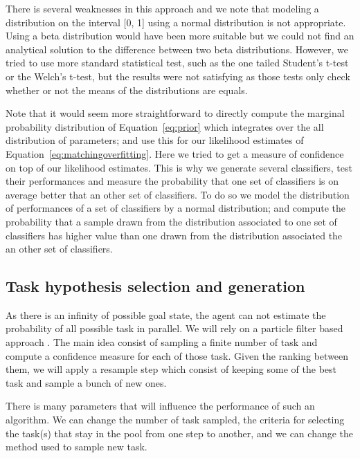 There is several weaknesses in this approach and we note that modeling a distribution on the interval [0, 1] using a normal distribution is not appropriate. Using a beta distribution would have been more suitable but we could not find an analytical solution to the difference between two beta distributions. However, we tried to use more standard statistical test, such as the one tailed Student's t-test or the Welch's t-test, but the results were not satisfying as those tests only check whether or not the means of the distributions are equals.

Note that it would seem more straightforward to directly compute the marginal probability distribution of Equation~\ref{eq:prior} which integrates over the all distribution of parameters; and use this for our likelihood estimates of Equation~\ref{eq:matchingoverfitting}. Here we tried to get a measure of confidence on top of our likelihood estimates. This is why we generate several classifiers, test their performances and measure the probability that one set of classifiers is on average better that an other set of classifiers. To do so we model the distribution of performances of a set of classifiers by a normal distribution; and compute the probability that a sample drawn from the distribution associated to one set of classifiers has higher value than one drawn from the distribution associated the an other set of classifiers.

\subsection{Task hypothesis selection and generation}
\label{chapter:limitations:continoushypothesis:particlefilter}

As there is an infinity of possible goal state, the agent can not estimate the probability of all possible task in parallel. We will rely on a particle filter based approach \cite{gordon1993novel,doucet2009tutorial,thrun2002particle}. The main idea consist of sampling a finite number of task and compute a confidence measure for each of those task. Given the ranking between them, we will apply a resample step which consist of keeping some of the best task and sample a bunch of new ones.

There is many parameters that will influence the performance of such an algorithm. We can change the number of task sampled, the criteria for selecting the task(s) that stay in the pool from one step to another, and we can change the method used to sample new task. 

